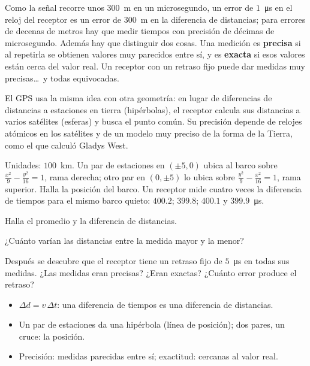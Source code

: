 \documentclass[11pt]{article}
\begin{document}
Como la señal recorre unos $300$~m en un microsegundo, un error de $1$~\unit{\micro\second}
en el reloj del receptor es un error de $300$~m en la diferencia de distancias; para
errores de decenas de metros hay que medir tiempos con precisión de décimas de
microsegundo. Además hay que distinguir dos cosas. Una medición es \textbf{precisa}
si al repetirla se obtienen valores muy parecidos entre sí, y es \textbf{exacta} si
esos valores están cerca del valor real. Un receptor con un retraso fijo puede dar
medidas muy precisas\ldots\ y todas equivocadas.

\begin{aplicacion}
El GPS usa la misma idea con otra geometría: en lugar de diferencias de distancias a
estaciones en tierra (hipérbolas), el receptor calcula sus distancias a varios
satélites (esferas) y busca el punto común. Su precisión depende de relojes atómicos
en los satélites y de un modelo muy preciso de la forma de la Tierra, como el que
calculó Gladys West.
\end{aplicacion}

\begin{preguntas}
\pregunta Unidades: $100$~km. Un par de estaciones en $(\pm 5, 0)$ ubica al barco
sobre $\frac{x^2}{9} - \frac{y^2}{16} = 1$, rama derecha; otro par en $(0, \pm 5)$ lo
ubica sobre $\frac{y^2}{9} - \frac{x^2}{16} = 1$, rama superior. Halla la posición
del barco.
\espacio{4.5cm}
\pregunta Un receptor mide cuatro veces la diferencia de tiempos para el mismo
barco quieto: $\num{400,2}$; $\num{399,8}$; $\num{400,1}$ y $\num{399,9}$~\unit{\micro\second}.
\begin{opciones}
  \item Halla el promedio y la diferencia de distancias.
  \item ¿Cuánto varían las distancias entre la medida mayor y la menor?
  \item Después se descubre que el receptor tiene un retraso fijo de
        $5$~\unit{\micro\second} en todas sus medidas. ¿Las medidas eran precisas?
        ¿Eran exactas? ¿Cuánto error produce el retraso?
\end{opciones}
\espacio{4cm}
\end{preguntas}

\begin{resumen}
\begin{itemize}
  \item $\Delta d = v\,\Delta t$: una diferencia de tiempos es una diferencia de distancias.
  \item Un par de estaciones da una hipérbola (línea de posición); dos pares, un cruce: la posición.
  \item Precisión: medidas parecidas entre sí; exactitud: cercanas al valor real.
\end{itemize}
\end{resumen}
\end{document}
